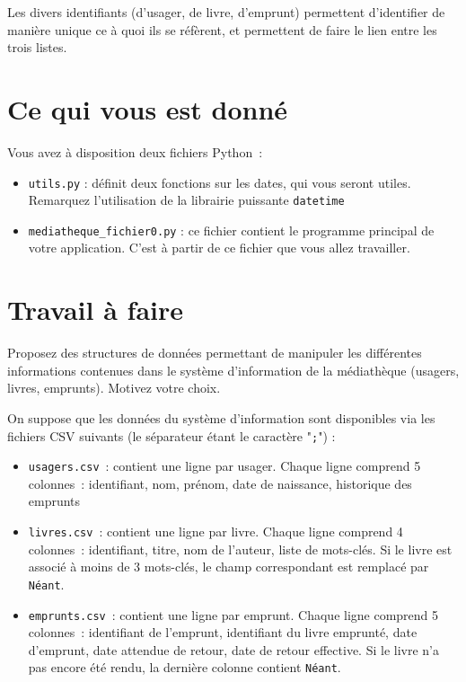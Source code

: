 \documentclass[10pt,a4paper]{sujets-exercices}
\begin{document}
Les divers identifiants (d'usager, de livre, d'emprunt) permettent d'identifier de manière unique ce à quoi ils se réfèrent, et permettent de faire le lien entre les trois listes. 

\section{Ce qui vous est donné}

Vous avez à disposition deux fichiers Python~:

\begin{itemize}
\item \texttt{utils.py} : définit deux fonctions sur les dates, qui vous seront utiles. Remarquez l'utilisation de la librairie puissante \texttt{datetime}
\item \texttt{mediatheque\_fichier0.py} : ce fichier contient le programme principal de votre application. C'est à partir de ce fichier que vous allez travailler. 
\end{itemize}

\section{Travail à faire}


Proposez des structures de données permettant de manipuler les différentes informations contenues dans le système d'information de la médiathèque (usagers, livres, emprunts). Motivez votre choix.


On suppose que les données du système d'information sont disponibles via les fichiers CSV suivants (le séparateur étant le caractère "\verb!;!") : 

\begin{itemize}
\item \texttt{usagers.csv}~: contient une ligne par usager. Chaque ligne comprend 5 colonnes~: identifiant, nom, prénom, date de naissance, historique des emprunts
\item \texttt{livres.csv}~: contient une ligne par livre. Chaque ligne comprend 4 colonnes~: identifiant, titre, nom de l'auteur, liste de mots-clés. Si le livre est associé à moins de 3 mots-clés, le champ correspondant est remplacé par \texttt{Néant}.
\item \texttt{emprunts.csv}~: contient une ligne par emprunt. Chaque ligne comprend 5 colonnes~: identifiant de l'emprunt, identifiant du livre emprunté, date d'emprunt, date attendue de retour, date de retour effective. Si le livre n'a pas encore été rendu, la dernière colonne contient \texttt{Néant}. 
\end{itemize}
\end{document}

